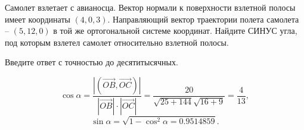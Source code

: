 
Самолет взлетает с авианосца. Вектор нормали к поверхности взлетной полосы имеет координаты $(4,0,3)$. Направляющий вектор траектории полета \linebreak самолета -- $(5,12,0)$ в той же ортогональной системе координат. Найдите СИНУС угла, под которым взлетел самолет относительно взлетной полосы.

Введите ответ с точностью до десятитысячных.

\solutionSection

$$\cos\alpha = \frac{|(\vec{OB}, \vec{OC})|}{|\vec{OB}|\cdot|\vec{OC}|} = \frac{20}{\sqrt{25+144}\sqrt{16+9}}= \frac{4}{13},$$
$$\sin\alpha = \sqrt{1 - \cos^2 \alpha = 0.9514859}.$$\\


